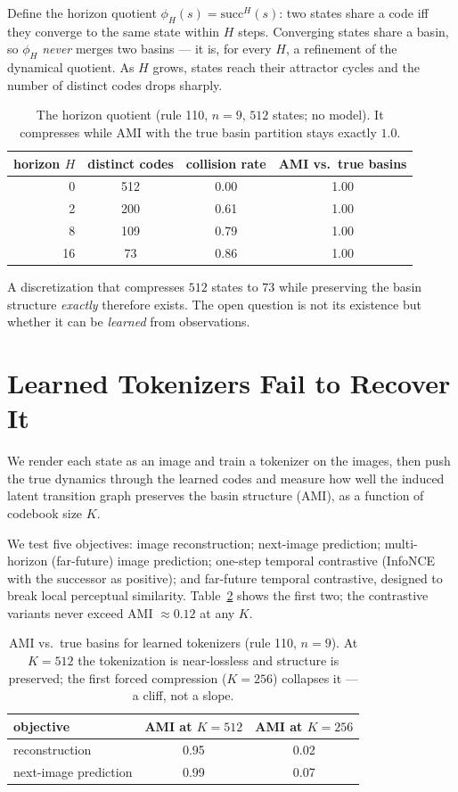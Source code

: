 \documentclass[11pt]{article}
\newcommand{\succf}{\mathrm{succ}}
\begin{document}
Define the horizon quotient $\phi_H(s) = \succf^{H}(s)$: two states share a
code iff they converge to the same state within $H$ steps. Converging states
share a basin, so $\phi_H$ \emph{never} merges two basins --- it is, for every
$H$, a refinement of the dynamical quotient. As $H$ grows, states reach their
attractor cycles and the number of distinct codes drops sharply.

\begin{table}[h]
\centering
\caption{The horizon quotient (rule 110, $n{=}9$, $512$ states; no model). It
compresses while AMI with the true basin partition stays exactly $1.0$.}
\label{tab:horizon}
\begin{tabular}{rccc}
\toprule
horizon $H$ & distinct codes & collision rate & AMI vs.\ true basins \\
\midrule
0  & 512 & 0.00 & 1.00 \\
2  & 200 & 0.61 & 1.00 \\
8  & 109 & 0.79 & 1.00 \\
16 &  73 & 0.86 & 1.00 \\
\bottomrule
\end{tabular}
\end{table}

A discretization that compresses $512$ states to $73$ while preserving the
basin structure \emph{exactly} therefore exists. The open question is not its
existence but whether it can be \emph{learned} from observations.

\section{Learned Tokenizers Fail to Recover It}
\label{sec:fail}

We render each state as an image and train a tokenizer on the images, then
push the true dynamics through the learned codes and measure how well the
induced latent transition graph preserves the basin structure (AMI), as a
function of codebook size $K$.

We test five objectives: image reconstruction; next-image prediction;
multi-horizon (far-future) image prediction; one-step temporal contrastive
(InfoNCE with the successor as positive); and far-future temporal contrastive,
designed to break local perceptual similarity. Table~\ref{tab:cliff} shows the
first two; the contrastive variants never exceed AMI $\approx 0.12$ at any $K$.

\begin{table}[h]
\centering
\caption{AMI vs.\ true basins for learned tokenizers (rule 110, $n{=}9$). At
$K{=}512$ the tokenization is near-lossless and structure is preserved; the
first forced compression ($K{=}256$) collapses it --- a cliff, not a slope.}
\label{tab:cliff}
\begin{tabular}{lcc}
\toprule
objective & AMI at $K{=}512$ & AMI at $K{=}256$ \\
\midrule
reconstruction       & 0.95 & 0.02 \\
next-image prediction & 0.99 & 0.07 \\
\bottomrule
\end{tabular}
\end{table}
\end{document}
